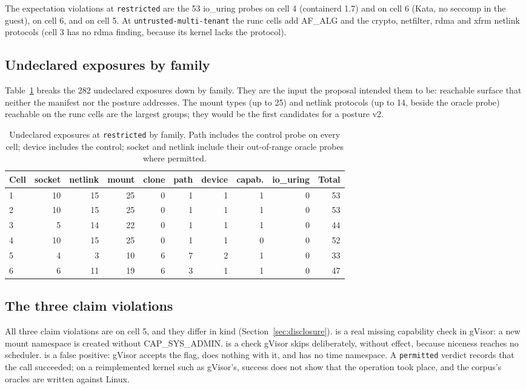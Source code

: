 The expectation violations at \texttt{restricted} are the 53 io\_uring probes on cell 4 (containerd 1.7) and on cell 6 (Kata, no seccomp in the guest),  on cell 6, and  on cell 5. At \texttt{untrusted-multi-tenant} the runc cells add AF\_ALG and the crypto, netfilter, rdma and xfrm netlink protocols (cell 3 has no rdma finding, because its kernel lacks the protocol).

\subsection{Undeclared exposures by family}
Table~\ref{tab:undeclared} breaks the 282 undeclared exposures down by family. They are the input the proposal intended them to be: reachable surface that neither the manifest nor the posture addresses. The mount types (up to 25) and netlink protocols (up to 14, beside the oracle probe) reachable on the runc cells are the largest groups; they would be the first candidates for a posture v2.

\begin{table}[htbp]
\centering\small
\begin{tabular}{@{}lrrrrrrrrr@{}}
\toprule
\textbf{Cell} & \textbf{socket} & \textbf{netlink} & \textbf{mount} & \textbf{clone} & \textbf{path} & \textbf{device} & \textbf{capab.} & \textbf{io\_uring} & \textbf{Total} \\
\midrule
1 & 10 & 15 & 25 & 0 & 1 & 1 & 1 & 0 & 53 \\
2 & 10 & 15 & 25 & 0 & 1 & 1 & 1 & 0 & 53 \\
3 & 5 & 14 & 22 & 0 & 1 & 1 & 1 & 0 & 44 \\
4 & 10 & 15 & 25 & 0 & 1 & 1 & 0 & 0 & 52 \\
5 & 4 & 3 & 10 & 6 & 7 & 2 & 1 & 0 & 33 \\
6 & 6 & 11 & 19 & 6 & 3 & 1 & 1 & 0 & 47 \\
\bottomrule
\end{tabular}
\caption{Undeclared exposures at \texttt{restricted} by family. Path includes the control probe on every cell; device includes the  control; socket and netlink include their out-of-range oracle probes where permitted.}
\label{tab:undeclared}
\end{table}

\subsection{The three claim violations}
All three claim violations are on cell 5, and they differ in kind (Section~\ref{sec:disclosure}).  is a real missing capability check in gVisor: a new mount namespace is created without CAP\_SYS\_ADMIN.  is a check gVisor skips deliberately, without effect, because niceness reaches no scheduler.  is a false positive: gVisor accepts the flag, does nothing with it, and has no time namespace. A \texttt{permitted} verdict records that the call succeeded; on a reimplemented kernel such as gVisor's, success does not show that the operation took place, and the corpus's oracles are written against Linux.

